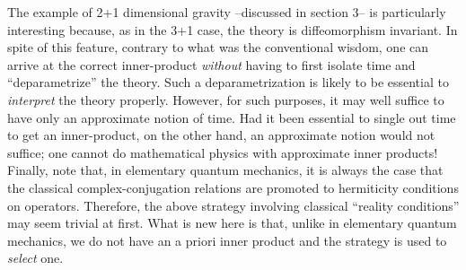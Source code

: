 The example of 2+1 dimensional gravity --discussed in section 3--
is particularly interesting because, as in the 3+1 case, the
theory is diffeomorphism invariant. In spite of this feature, contrary to
what was the conventional wisdom, one can arrive at the correct inner-product
{\it without} having to first isolate time and ``deparametrize'' the theory.
Such a deparametrization is likely to be essential to {\it interpret} the
theory properly. However, for such purposes, it may well suffice to have
only an approximate notion of time. Had it been essential to single out time
to get an inner-product, on the other hand, an approximate notion would
not suffice; one cannot do mathematical physics with approximate inner
products! Finally, note that, in elementary quantum mechanics, it is
always the case that the classical complex-conjugation relations are
promoted to hermiticity conditions on operators. Therefore, the above
strategy involving classical ``reality conditions'' may seem trivial at
first. What is new here is that, unlike in elementary quantum mechanics,
we do not have an a priori inner product and the strategy is used to {\it
select} one.

